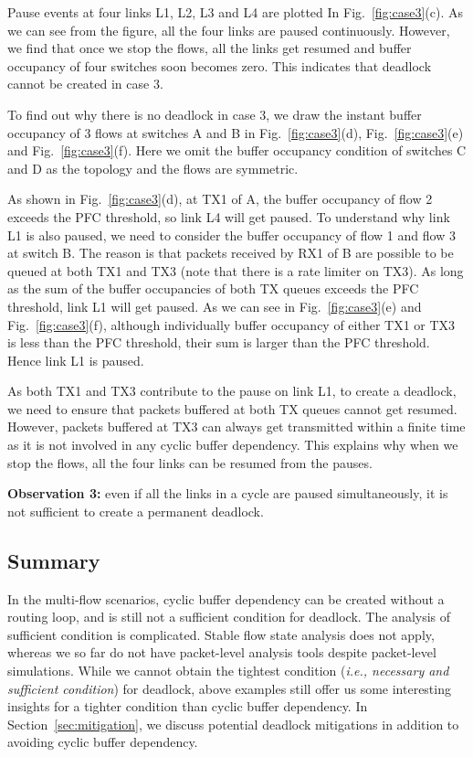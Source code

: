 Pause events at four links L1, L2, L3 and L4 are plotted In Fig.~\ref{fig:case3}(c).  As we can see 
from the figure, all the four links are paused continuously. However, we find that once we stop the 
flows, all the links get resumed and buffer occupancy of four switches soon becomes zero. This 
indicates that deadlock cannot be created in case 3.

To find out why there is no deadlock in case 3, we draw the instant buffer occupancy of 3 flows at 
switches A and B in Fig.~\ref{fig:case3}(d), Fig.~\ref{fig:case3}(e) and Fig.~\ref{fig:case3}(f). 
Here we omit the buffer occupancy condition of switches C and D as the topology and the flows are symmetric.

As shown in Fig.~\ref{fig:case3}(d), at TX1 of A, the buffer occupancy of flow 2 exceeds the PFC 
threshold, so link L4 will get paused. To understand why link L1 is also paused, we need to consider 
the buffer occupancy of flow 1 and flow 3 at switch B. The reason is that packets received by RX1 of 
B are possible to be queued at both TX1 and TX3 (note that there is a rate limiter on TX3). As long 
as the sum of the buffer occupancies of both TX queues exceeds the PFC threshold, link L1 will get paused. 
As we can see in Fig.~\ref{fig:case3}(e) and Fig.~\ref{fig:case3}(f), although individually buffer 
occupancy of either TX1 or TX3 is less than the PFC threshold, their sum is larger than the PFC 
threshold. Hence link L1 is paused.

As both TX1 and TX3 contribute to the pause on link L1, to create a deadlock, we need to ensure that 
packets buffered at both TX queues cannot get resumed. However, packets buffered at TX3 can always get 
transmitted within a finite time as it is not involved in any cyclic buffer dependency. This explains 
why when we stop the flows, all the four links can be resumed from the pauses. 


\textbf{Observation 3:} even if all the links in a cycle are paused simultaneously, it is not 
sufficient to create a permanent deadlock.

\subsection{Summary} In the multi-flow scenarios, cyclic buffer dependency can be created without 
a routing loop, and is still not a sufficient condition for deadlock. The analysis of sufficient
condition is complicated. Stable flow state analysis does not apply, whereas we so far do not have 
packet-level analysis tools despite packet-level simulations. While we cannot obtain the tightest
condition ({\em i.e., necessary and sufficient condition}) for deadlock, above examples still offer
us some interesting insights for a tighter condition than cyclic buffer dependency. In Section~\ref{sec:mitigation},
we discuss potential deadlock mitigations in addition to avoiding cyclic buffer dependency.

